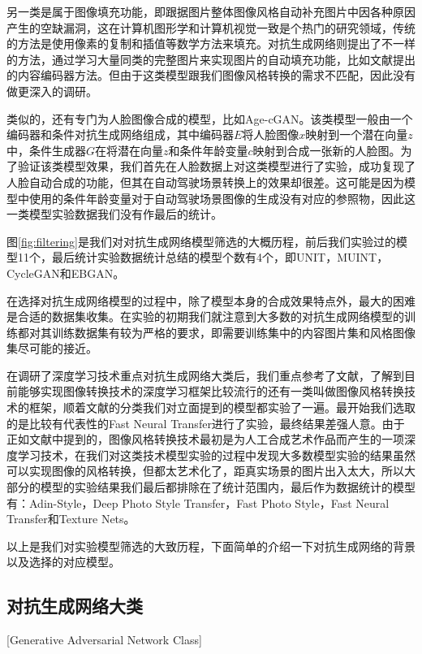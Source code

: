 另一类是属于图像填充功能，即跟据图片整体图像风格自动补充图片中因各种原因产生的空缺漏洞，这在计算机图形学和计算机视觉一致是个热门的研究领域，传统的方法是使用像素的复制和插值等数学方法来填充。对抗生成网络则提出了不一样的方法，通过学习大量同类的完整图片来实现图片的自动填充功能，比如文献\cite{GAN-inpaiting}提出的内容编码器方法。但由于这类模型跟我们图像风格转换的需求不匹配，因此没有做更深入的调研。

类似的，还有专门为人脸图像合成的模型，比如Age-cGAN\cite{Age-cGAN}。该类模型一般由一个编码器和条件对抗生成网络组成，其中编码器$E$将人脸图像$x$映射到一个潜在向量$z$中，条件生成器$G$在将潜在向量$z$和条件年龄变量$c$映射到合成一张新的人脸图。为了验证该类模型效果，我们首先在人脸数据上对这类模型进行了实验，成功复现了人脸自动合成的功能，但其在自动驾驶场景转换上的效果却很差。这可能是因为模型中使用的条件年龄变量对于自动驾驶场景图像的生成没有对应的参照物，因此这一类模型实验数据我们没有作最后的统计。


图\ref{fig:filtering}是我们对对抗生成网络模型筛选的大概历程，前后我们实验过的模型11个，最后统计实验数据统计总结的模型个数有4个，即UNIT\cite{UNIT}，MUINT\cite{MUNIT}，CycleGAN\cite{CycleGAN}和EBGAN\cite{ebgan}。

在选择对抗生成网络模型的过程中，除了模型本身的合成效果特点外，最大的困难是合适的数据集收集。在实验的初期我们就注意到大多数的对抗生成网络模型的训练都对其训练数据集有较为严格的要求，即需要训练集中的内容图片集和风格图像集尽可能的接近。

在调研了深度学习技术重点对抗生成网络大类后，我们重点参考了文献\cite{nst-survey}，了解到目前能够实现图像转换技术的深度学习框架比较流行的还有一类叫做图像风格转换技术的框架，顺着文献的分类我们对立面提到的模型都实验了一遍。最开始我们选取的是比较有代表性的Fast Neural Transfer进行了实验，最终结果差强人意。由于正如文献中提到的，图像风格转换技术最初是为人工合成艺术作品而产生的一项深度学习技术，在我们对这类技术模型实验的过程中发现大多数模型实验的结果虽然可以实现图像的风格转换，但都太艺术化了，距真实场景的图片出入太大，所以大部分的模型的实验结果我们最后都排除在了统计范围内，最后作为数据统计的模型有：Adin-Style\cite{adain}，Deep Photo Style Transfer\cite{dpst}，Fast Photo Style\cite{fps}，Fast Neural Transfer\cite{FNT}和Texture Nets\cite{texture-nets}。


以上是我们对实验模型筛选的大致历程，下面简单的介绍一下对抗生成网络的背景以及选择的对应模型。

\subsection{对抗生成网络大类}[Generative Adversarial Network Class]

